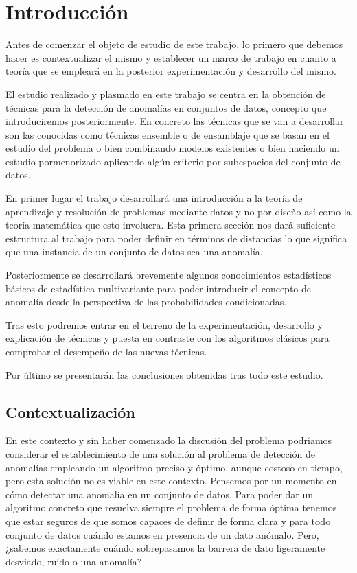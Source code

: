 \chapter{Introducción}
\label{chapter:introduccion}
\setcounter{page}{1}

Antes de comenzar el objeto de estudio de este trabajo, lo primero que debemos hacer es contextualizar el mismo y establecer un marco de trabajo en cuanto a teoría que se empleará en la posterior experimentación y desarrollo del mismo. 

El estudio realizado y plasmado en este trabajo se centra en la obtención de técnicas para la detección de anomalías en conjuntos de datos, concepto que introduciremos posteriormente. En concreto las técnicas que se van a desarrollar son las conocidas como técnicas ensemble o de ensamblaje que se basan en el estudio del problema o bien combinando modelos existentes o bien haciendo un estudio pormenorizado aplicando algún criterio por subespacios del conjunto de datos. 

En primer lugar el trabajo desarrollará una introducción a la teoría de aprendizaje y resolución de problemas mediante datos y no por diseño así como la teoría matemática que esto involucra. Esta primera sección nos dará suficiente estructura al trabajo para poder definir en términos de distancias lo que significa que una instancia de un conjunto de datos sea una anomalía.

Posteriormente se desarrollará brevemente algunos conocimientos estadísticos básicos de estadística multivariante para poder introducir el concepto de anomalía desde la perspectiva de las probabilidades condicionadas.

Tras esto podremos entrar en el terreno de la experimentación, desarrollo y explicación de técnicas y puesta en contraste con los algoritmos clásicos para comprobar el desempeño de las nuevas técnicas.

Por último se presentarán las conclusiones obtenidas tras todo este estudio.

\section{Contextualización}

En este contexto y sin haber comenzado la discusión del problema podríamos considerar el establecimiento de una solución al problema de detección de anomalías empleando un algoritmo preciso y óptimo, aunque costoso en tiempo, pero esta solución no es viable en este contexto. Pensemos por un momento en cómo detectar una anomalía en un conjunto de datos. Para poder dar un algoritmo concreto que resuelva siempre el problema de forma óptima tenemos que estar seguros de que somos capaces de definir de forma clara y para todo conjunto de datos cuándo estamos en presencia de un dato anómalo. Pero, ¿sabemos exactamente cuándo sobrepasamos la barrera de dato ligeramente desviado, ruido o una anomalía? 

